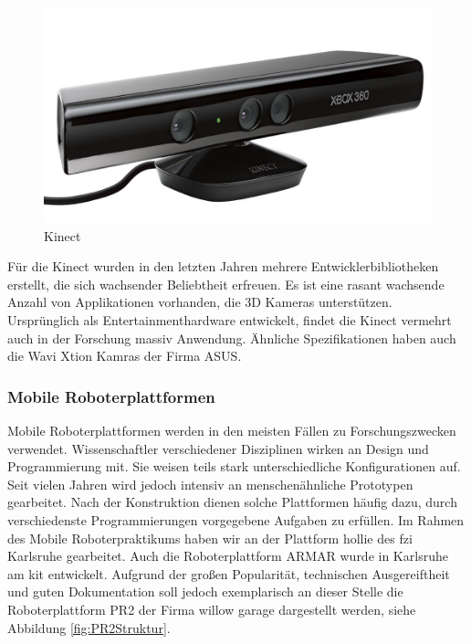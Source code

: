 \begin{figure}[h]
\center
\includegraphics[scale=0.3]{graphics/Kinect.jpg}
\caption{\label{fig:Kinect} Kinect \cite{kinect_bild}}
\end{figure}

Für die Kinect wurden in den letzten Jahren mehrere Entwicklerbibliotheken erstellt,
 die sich wachsender Beliebtheit erfreuen. Es ist eine rasant wachsende Anzahl von Applikationen vorhanden,
 die 3D Kameras unterstützen. Ursprünglich als Entertainmenthardware entwickelt,
 findet die Kinect vermehrt auch in der Forschung massiv Anwendung.
 Ähnliche Spezifikationen haben auch die Wavi Xtion Kamras der Firma ASUS.

\subsubsection{Mobile Roboterplattformen}

Mobile Roboterplattformen werden in den meisten Fällen zu Forschungszwecken verwendet.
 Wissenschaftler verschiedener Disziplinen wirken an Design und Programmierung mit.
 Sie weisen teils stark unterschiedliche Konfigurationen auf.
 Seit vielen Jahren wird jedoch intensiv an menschenähnliche Prototypen gearbeitet.
 Nach der Konstruktion dienen solche Plattformen häufig dazu, durch verschiedenste Programmierungen
 vorgegebene Aufgaben zu erfüllen. Im Rahmen des Mobile Roboterpraktikums haben
 wir an der Plattform \gls{hollie} des \gls{fzi} Karlsruhe gearbeitet. Auch die
 Roboterplattform ARMAR wurde in Karlsruhe am \gls{kit} entwickelt.
 Aufgrund der großen Popularität, technischen Ausgereiftheit und guten
 Dokumentation soll jedoch exemplarisch an dieser Stelle die Roboterplattform
 PR2 der Firma willow garage dargestellt werden, siehe Abbildung
 \ref{fig:PR2Struktur}.

